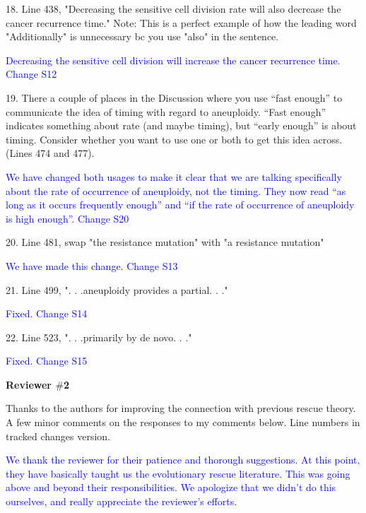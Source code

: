 \documentclass[12pt]{extarticle}
\begin{document}
18. Line 438, "Decreasing the sensitive cell division rate will also decrease the cancer recurrence time." Note: This is a perfect example of how the leading word "Additionally" is unnecessary bc you use "also" in the sentence.

\textcolor{blue}{Decreasing the sensitive cell division will increase the cancer recurrence time. Change S12}

19. There a couple of places in the Discussion where you use ``fast enough'' to communicate the idea of timing with regard to aneuploidy. ``Fast enough'' indicates something about rate (and maybe timing), but ``early enough'' is about timing. Consider whether you want to use one or both to get this idea across. (Lines 474 and 477).

\textcolor{blue}{We have changed both usages to make it clear that we are talking specifically about the rate of occurrence of aneuploidy, not the timing. They now read ``as long as it occurs frequently enough'' and ``if the rate of occurrence of aneuploidy is high enough''. Change S20}

20. Line 481, swap "the resistance mutation" with "a resistance mutation"

\textcolor{blue}{We have made this change. Change S13}

21. Line 499, ". . .aneuploidy provides a partial. . ."

\textcolor{blue}{Fixed. Change S14}

22. Line 523, ". . .primarily by de novo. . ."

\textcolor{blue}{Fixed. Change S15}

\textbf{Reviewer $\#$2}

Thanks to the authors for improving the connection with previous rescue theory. A few minor comments on the responses to my comments below. Line numbers in tracked changes version.

\textcolor{blue}{We thank the reviewer for their patience and thorough suggestions. At this point, they have basically taught us the evolutionary rescue literature. 
This was going above and beyond their responsibilities. 
We apologize that we didn't do this ourselves, and really appreciate the reviewer's efforts.}
\end{document}
